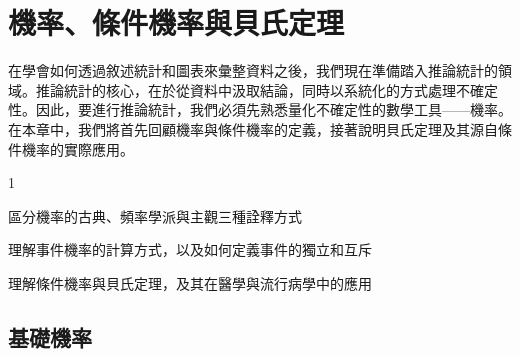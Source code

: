 \chapter{機率、條件機率與貝氏定理}
    在學會如何透過敘述統計和圖表來彙整資料之後，我們現在準備踏入推論統計的領域。推論統計的核心，在於從資料中汲取結論，同時以系統化的方式處理不確定性。因此，要進行推論統計，我們必須先熟悉量化不確定性的數學工具——機率。在本章中，我們將首先回顧機率與條件機率的定義，接著說明貝氏定理及其源自條件機率的實際應用。
    
    \begin{introduction}{1}
        \item 區分機率的古典、頻率學派與主觀三種詮釋方式
        \item 理解事件機率的計算方式，以及如何定義事件的獨立和互斥
        \item 理解條件機率與貝氏定理，及其在醫學與流行病學中的應用
    \end{introduction}

\section{基礎機率}
